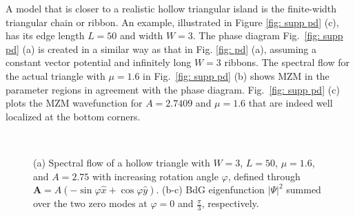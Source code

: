A model that is closer to a realistic hollow triangular island is the finite-width triangular chain or ribbon. An example, illustrated in Figure \ref{fig: supp pd} (c), has its edge length $L=50$ and width $W=3$. The phase diagram Fig.~\ref{fig: supp pd} (a) is created in a similar way as that in Fig. \ref{fig: pd} (a), assuming a constant vector potential and infinitely long $W=3$ ribbons. The spectral flow for the actual triangle with $\mu = 1.6$ in Fig.~\ref{fig: supp pd} (b) shows MZM in the parameter regions in agreement with the phase diagram. Fig.~\ref{fig: supp pd} (c) plots the MZM wavefunction for $A=2.7409$ and $\mu=1.6$ that are indeed well localized at the bottom corners.

\begin{figure}[!ht]
  \hspace{-20pt}
  \\
  \caption{(a) Spectral flow of a hollow triangle with $W=3$, $L=50$, $\mu=1.6$, and $A=2.75$ with increasing rotation angle $\varphi$, defined through $\mathbf A = A(-\sin\varphi \hat{x} + \cos\varphi \hat{y})$. (b-c) BdG eigenfunction $|\Psi|^2$ summed over the two zero modes at $\varphi = 0$ and $\frac{\pi}{3}$, respectively.}
  \label{fig: supp rotation}
\end{figure}

